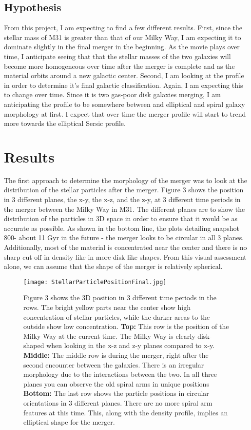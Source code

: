 \documentclass{aastex63}
\begin{document}
\subsection{Hypothesis}
From this project, I am expecting to find a few different results. First, since the stellar mass of M31 is greater than that of our Milky Way, I am expecting it to dominate slightly in the final merger in the beginning. As the movie plays over time, I anticipate seeing that that the stellar masses of the two galaxies will become more homogeneous over time after the merger is complete and as the material orbits around a new galactic center. Second, I am looking at the profile in order to determine it's final galactic classification. Again, I am expecting this to change over time. Since it is two gas-poor disk galaxies merging, I am anticipating the profile to be somewhere between and elliptical and spiral galaxy morphology at first. I expect that over time the merger profile will start to trend more towards the elliptical Sersic profile. 

\section{Results}

The first approach to determine the morphology of the merger was to look at the distribution of the stellar particles after the merger. Figure 3 shows the position in 3 different planes, the x-y, the x-z, and the z-y, at 3 different time periods in the merger between the Milky Way in M31. The different planes are to show the distribution of the particles in 3D space in order to ensure that it would be as accurate as possible.  As shown in the bottom line, the plots detailing snapshot 800- about 11 Gyr in the future - the merger looks to be circular in all 3 planes. Additionally, most of the material is concentrated near the center and there is no sharp cut off in density like in more disk like shapes. From this visual assessment alone, we can assume that the shape of the merger is relatively spherical. 


 \begin{figure}
    \centering
    \texttt{[image: StellarParticlePositionFinal.jpg]}
    \caption{Figure 3 shows the 3D position in 3 different time periods in the rows. The bright yellow parts near the center show high concentration of stellar particles, while the darker areas to the outside show low concentration. \textbf{Top:} This row is the position of the Milky Way at the current time. The Milky Way is clearly disk-shaped when looking in the x-z and z-y planes compared to x-y. \textbf{Middle:} The middle row is during the merger, right after the second encounter between the galaxies. There is an irregular morphology due to the interactions between the two. In all three planes you can observe the old spiral arms in unique positions \textbf{Bottom:} The last row shows the particle positions in circular orientations in 3 different planes. There are no more spiral arm features at this time. This, along with the density profile, implies an elliptical shape for the merger. }
    \label{fig:fig_planes}
\end{figure}
\end{document}
